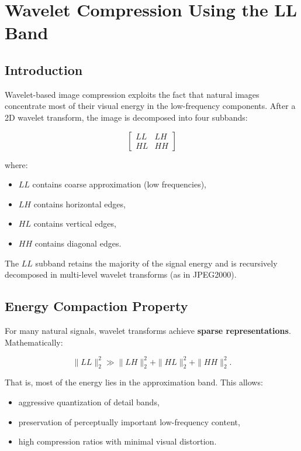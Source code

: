 \documentclass{AnantDocumentation}
\begin{document}
\section{Wavelet Compression Using the LL Band}

\subsection{Introduction}

Wavelet-based image compression exploits the fact that natural images concentrate most of their visual energy in the low-frequency components.  
After a 2D wavelet transform, the image is decomposed into four subbands:

\[
\begin{bmatrix}
LL & LH \\
HL & HH
\end{bmatrix}
\]

where:

\begin{itemize}
\item $LL$ contains coarse approximation (low frequencies),
\item $LH$ contains horizontal edges,
\item $HL$ contains vertical edges,
\item $HH$ contains diagonal edges.
\end{itemize}

The $LL$ subband retains the majority of the signal energy and is recursively decomposed in multi-level wavelet transforms (as in JPEG2000).

\subsection{Energy Compaction Property}

For many natural signals, wavelet transforms achieve \textbf{sparse representations}.  
Mathematically:

\[
\|LL\|_2^2 \gg \|LH\|_2^2 + \|HL\|_2^2 + \|HH\|_2^2.
\]

That is, most of the energy lies in the approximation band.  
This allows:

\begin{itemize}
\item aggressive quantization of detail bands,
\item preservation of perceptually important low-frequency content,
\item high compression ratios with minimal visual distortion.
\end{itemize}
\end{document}
